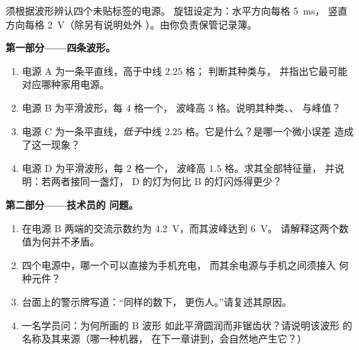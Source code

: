 \begin{problem}\label{pb:g9:alternating-current:1}
须根据波形辨认四个未贴标签的电源。
旋钮设定为：水平方向每格 \qty{5}{ms}，
竖直方向每格 \qty{2}{V}（除另有说明处外
）。由你负责保管记录簿。

\medskip\noindent\textbf{第一部分——四条波形。}
\begin{enumerate}
  \item 电源 A 为一条平直线，高于中线 $2.25$ 格；
        判断其种类与，
        并指出它最可能对应哪种家用电源。
  \item 电源 B 为平滑波形，每 $4$ 格一个，
        波峰高 $3$ 格。说明其种类、、
        与峰值？
  \item 电源 C 为一条平直线，\emph{低于}中线
        $2.25$ 格。它是什么？是哪一个微小误差
        造成了这一现象？
  \item 电源 D 为平滑波形，每 $2$ 格一个，
        波峰高 $1.5$ 格。求其全部特征量，
        并说明：若两者接同一盏灯，
        D 的灯为何比 B 的灯闪烁得更少？
\end{enumerate}

\medskip\noindent\textbf{第二部分——技术员的
问题。}
\begin{enumerate}[resume]
  \item {}在电源 B 两端的交流示数约为
        \qty{4.2}{V}，而其波峰达到 \qty{6}{V}。
        请解释这两个数值为何并不矛盾。
  \item 四个电源中，哪一个可以直接为手机充电，
        而其余电源与手机之间须接入
        何种元件？
  \item 台面上的警示牌写道：“同样的数下，
        更伤人。”请复述其原因。
  \item 一名学员问：为何所画的 B 波形
        如此平滑圆润而非锯齿状？请说明该波形
        的名称及其来源（哪一种机器，
        在下一章讲到，会自然地产生它？）
\end{enumerate}


\end{problem}
